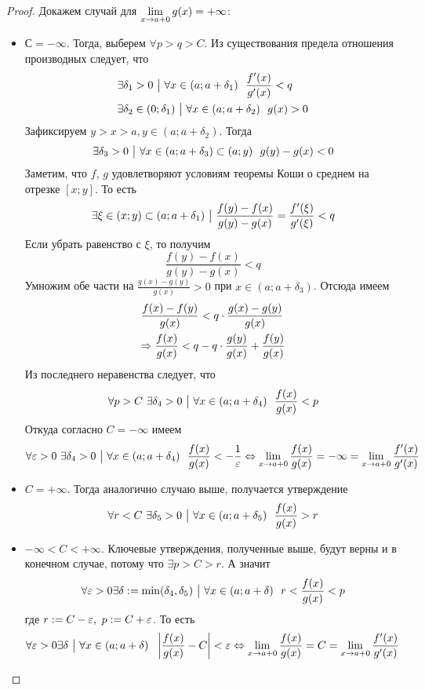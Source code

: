 \begin{proof}
	Докажем случай для $\lim\limits_{x \to a + 0} g(x) = +\infty$:
	\begin{itemize}
		\item $С = -\infty$. Тогда, выберем $\forall p > q > C$. Из существования предела отношения производных следует, что
		\begin{align*}
			&\exists \delta_1 > 0 \ \big|\  \forall x \in (a; a + \delta_1)\ \ \frac{f'(x)}{g'(x)} < q
			\\
			&\exists \delta_2 \in (0; \delta_1) \ \big|\  \forall x \in (a; a + \delta_2)\ \ g(x) > 0
		\end{align*}
		Зафиксируем $y > x > a, y \in (a; a + \delta_2)$. Тогда
		\[
			\exists \delta_3 > 0 \ \big|\  \forall x \in (a; a + \delta_3) \subset (a; y)\ \ g(y) - g(x) < 0
		\]
		Заметим, что $f$, $g$ удовлетворяют условиям теоремы Коши о среднем на отрезке $[x; y]$. То есть
		\[
			\exists \xi \in (x; y) \subset (a; a + \delta_1) \ \big|\  \frac{f(y) - f(x)}{g(y) - g(x)} = \frac{f'(\xi)}{g'(\xi)} < q
		\]
		Если убрать равенство с $\xi$, то получим
		\[
			\frac{f(y) - f(x)}{g(y) - g(x)} < q
		\]
		Умножим обе части на $\frac{g(x) - g(y)}{g(x)} > 0$ при $x \in (a; a + \delta_3)$. Отсюда имеем
		\begin{align*}
			&{\frac{f(x) - f(y)}{g(x)} < q \cdot \frac{g(x) - g(y)}{g(x)}}
			\\
			&{\Rightarrow \frac{f(x)}{g(x)} < q - q \cdot \frac{g(y)}{g(x)} + \frac{f(y)}{g(x)}}
		\end{align*}
		Из последнего неравенства следует, что
		\[
			\forall p > C\ \exists \delta_4 > 0 \ \big|\  \forall x \in (a; a + \delta_4)\ \ \frac{f(x)}{g(x)} < p
		\]
		Откуда согласно $C = -\infty$ имеем
		\[
			\forall \varepsilon > 0\ \exists \delta_4 > 0 \ \big|\  \forall x \in (a; a + \delta_4)\ \ \frac{f(x)}{g(x)} < -\frac{1}{\varepsilon} \Leftrightarrow \lim\limits_{x \to a + 0} \frac{f(x)}{g(x)} = -\infty = \lim\limits_{x \to a + 0} \frac{f'(x)}{g'(x)}
		\]
		
		\item $C = +\infty$. Тогда аналогично случаю выше, получается утверждение
		\[
			\forall r < C\ \exists \delta_5 > 0 \ \big|\  \forall x \in (a; a + \delta_5)\ \ \frac{f(x)}{g(x)} > r
		\]
		
		\item $-\infty < C < +\infty$. Ключевые утверждения, полученные выше, будут верны и в конечном случае, потому что $\exists p > C > r$. А значит
		\[
			\forall \varepsilon > 0 \exists \delta := \min(\delta_4, \delta_5) \ \big|\  \forall x \in (a; a + \delta)\ \ r < \frac{f(x)}{g(x)} < p
		\]
		где $r := C - \varepsilon,\ p := C + \varepsilon$. То есть
		\[
			\forall \varepsilon > 0 \exists \delta \ \big|\  \forall x \in (a; a + \delta)\ \ \left|\frac{f(x)}{g(x)} - C\right| < \varepsilon \Leftrightarrow \lim\limits_{x \to a + 0} \frac{f(x)}{g(x)} = C = \lim\limits_{x \to a + 0} \frac{f'(x)}{g'(x)}
		\]
	\end{itemize}
\end{proof}

